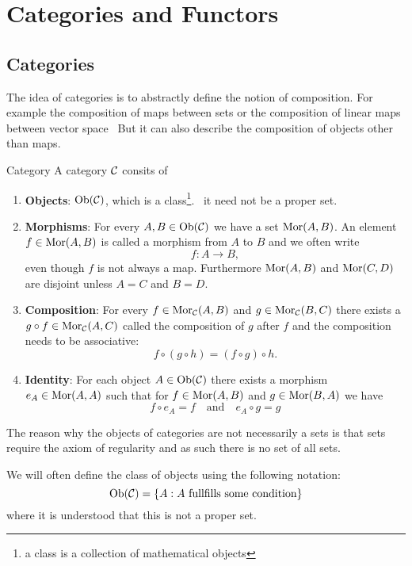 \chapter{Categories and Functors}
\section{Categories}

The idea of categories is to abstractly define the notion of composition.
For example the composition of maps between sets or the composition of linear maps between vector space \etc\
But it can also describe the composition of objects other than maps.

\begin{definition}{Category}{}
\cite{Roman2017} \source A category $\mathcal{C}$ consits of
\begin{enumerate}
    \item \textbf{Objects}: $\mathrm {Ob}(\mathcal{C})$, which is a class\footnote{a class is a collection of mathematical objects}. \Ie\ it need not be a proper set.
    
    \item \textbf{Morphisms}: For every $A, B \in \mathrm {Ob}(\mathcal{C})$ we have a set $\mathrm {Mor}(A,B)$. An element $f \in \mathrm {Mor}(A,B)$ is called a morphism from $A$ to $B$ and we often write 
    $$
    f: A \to B,
    $$
    even though $f$ is not always a map. Furthermore $\mathrm {Mor}(A,B)$ and $\mathrm {Mor}(C,D)$ are disjoint unless $A = C$ and $B = D$.
    
    \item \textbf{Composition}: For every $f \in \mathrm {Mor}_{\mathcal{C}}(A,B)$ and $g \in \mathrm {Mor}_{\mathcal{C}}(B,C)$ there exists a $g \circ f \in \mathrm {Mor}_{\mathcal{C}}(A,C)$ called the composition of $g$ after $f$ and the composition needs to be associative: 
    $$
    f \circ (g \circ h) = (f \circ g) \circ h.
    $$

    \item \textbf{Identity}: For each object $A \in \mathrm {Ob}(\mathcal{C})$ there exists a morphism $e_A \in \mathrm {Mor}(A,A)$ such that for $f \in \mathrm {Mor}(A,B)$ and $g \in \mathrm {Mor}(B,A)$ we have
    $$
    f \circ e_A = f \quad \text{and} \quad e_A \circ g = g
    $$
\end{enumerate}
\end{definition}

The reason why the objects of categories are not necessarily a sets is that sets require the axiom of regularity and as such there is no set of all sets.
\begin{notation}{}{}
We will often define the class of objects using the following notation:
\begin{equation*}
    \mathrm {Ob}(\mathcal{C}) = \{A: \text{$A$ fullfills some condition}\}
\end{equation*}
where it is understood that this is not a proper set.
\end{notation}

